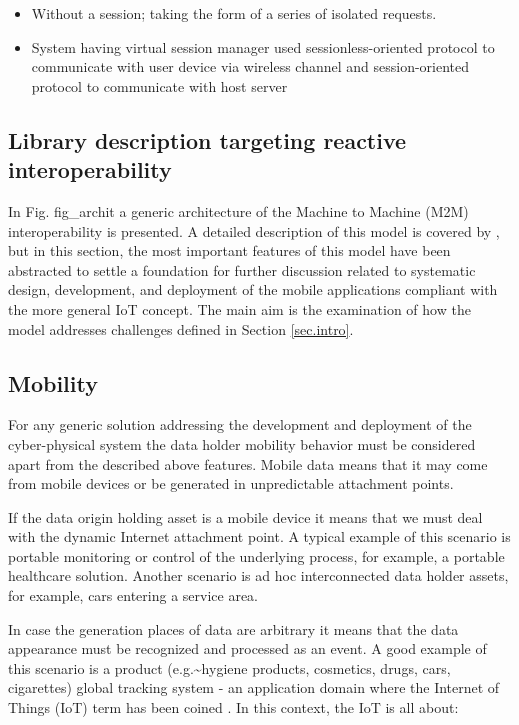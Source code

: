 \documentclass[
]{article}
\providecommand{\tightlist}{%
  \setlength{\itemsep}{0pt}\setlength{\parskip}{0pt}}
\begin{document}
\begin{itemize}
\tightlist
\item
  Without a session; taking the form of a series of isolated requests.
\item
  System having virtual session manager used sessionless-oriented
  protocol to communicate with user device via wireless channel and
  session-oriented protocol to communicate with host server
\end{itemize}

\hypertarget{library-description-targeting-reactive-interoperability}{%
\subsection{Library description targeting reactive
interoperability}\label{library-description-targeting-reactive-interoperability}}

In Fig. fig\_archit a generic architecture of the Machine to Machine
(M2M) interoperability is presented. A detailed description of this
model is covered by \cite{RefWorks:doc:5d6cdbbbe4b082ad50f3a83e}, but in
this section, the most important features of this model have been
abstracted to settle a foundation for further discussion related to
systematic design, development, and deployment of the mobile
applications compliant with the more general IoT concept. The main aim
is the examination of how the model addresses challenges defined in
Section \ref*{sec.intro}.

\hypertarget{mobility}{%
\subsection{Mobility}\label{mobility}}

For any generic solution addressing the development and deployment of
the cyber-physical system the data holder mobility behavior must be
considered apart from the described above features. Mobile data means
that it may come from mobile devices or be generated in unpredictable
attachment points.

If the data origin holding asset is a mobile device it means that we
must deal with the dynamic Internet attachment point. A typical example
of this scenario is portable monitoring or control of the underlying
process, for example, a portable healthcare solution. Another scenario
is ad hoc interconnected data holder assets, for example, cars entering
a service area.

In case the generation places of data are arbitrary it means that the
data appearance must be recognized and processed as an event. A good
example of this scenario is a product (e.g.\textasciitilde hygiene
products, cosmetics, drugs, cars, cigarettes) global tracking system -
an application domain where the Internet of Things (IoT) term has been
coined
\cite{RefWorks:doc:5d87d1c9e4b0bc72a68d7b46, RefWorks:doc:5d87d02be4b0e88bdacab9a7}.
In this context, the IoT is all about:
\end{document}
